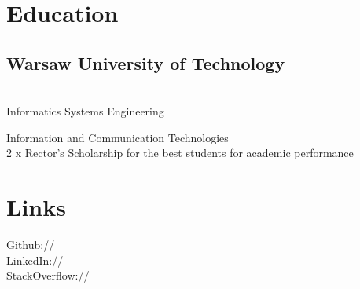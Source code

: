 \documentclass[]{deedy-resume-openfont}
\begin{document}
%
%
\lastupdated

%
%



%
%

\begin{minipage}[t]{0.33\textwidth} 


\section{Education} 

\subsection{Warsaw University of Technology}
 \\ 
Informatics Systems Engineering
\sectionsep


Information and Communication Technologies \\
2 x Rector’s Scholarship for the best students for academic performance 
\sectionsep



\section{Links} 
Github:// \href{github.com/emlagowski}{} \\
LinkedIn://  \href{https://www.linkedin.com/in/marcinlagowski}{} \\
StackOverflow://  \href{http://stackoverflow.com/users/3233685/marcin-lagowski}{} 
\sectionsep


\end{minipage}
\end{document}
